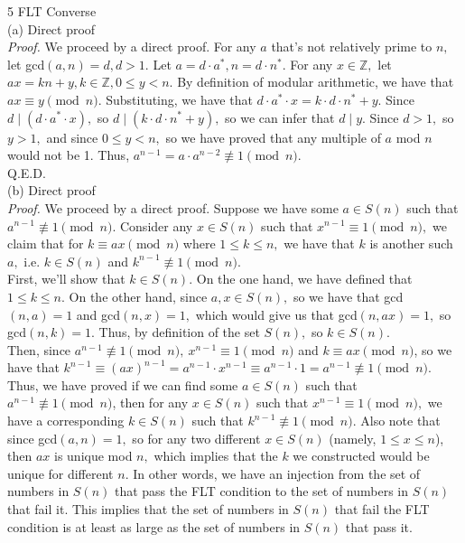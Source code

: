 \documentclass{article}
\begin{document}
{\Large 5 FLT Converse} \\[.5cm]
(a) Direct proof \\[.3cm]
\textit{Proof.} We proceed by a direct proof. For any $a$ that's not relatively prime to $n,$ let gcd$(a, n) = d, d > 1.$ Let $a = d\cdot a^*, n = d\cdot n^*.$ For any $x\in\mathbb{Z},$ let $ax = kn + y, k\in\mathbb{Z}, 0\leq y<n.$ By definition of modular arithmetic, we have that $ax\equiv y\pmod{n}.$ Substituting, we have that $d\cdot a^*\cdot x = k\cdot d\cdot n^* + y.$ Since $d\mid (d\cdot a^*\cdot x),$ so $d\mid (k\cdot d\cdot n^* + y),$ so we can infer that $d\mid y.$ Since $d > 1,$ so $y > 1,$ and since $0\leq y<n,$ so we have proved that any multiple of $a$ mod $n$ would not be 1. Thus, $a^{n-1} = a\cdot a^{n-2}\not\equiv1\pmod{n}.$ \\[.1cm]
Q.E.D.\\[.5cm]
(b) Direct proof \\[.3cm]
\textit{Proof.} We proceed by a direct proof. Suppose we have some $a\in S(n)$ such that $a^{n-1}\not\equiv1\pmod{n}.$ Consider any $x\in S(n)$ such that $x^{n-1}\equiv1\pmod{n},$ we claim that for $k\equiv ax\pmod{n}$ where $1\leq k\leq n,$ we have that $k$ is another such $a,$ i.e. $k\in S(n)$ and $k^{n-1}\not\equiv1\pmod{n}.$ \\[.1cm]
\indent First, we'll show that $k\in S(n).$ On the one hand, we have defined that $1\leq k\leq n.$ On the other hand, since $a,x\in S(n),$ so we have that gcd$(n, a) = 1$ and gcd$(n, x) = 1,$ which would give us that gcd$(n, ax) = 1,$ so gcd$(n, k) = 1$. Thus, by definition of the set $S(n),$ so $k\in S(n).$ \\[.1cm]
\indent Then, since $a^{n-1}\not\equiv1\pmod{n},\ x^{n-1}\equiv1\pmod{n}$ and $k\equiv ax\pmod{n}$, so we have that  $k^{n-1}\equiv(ax)^{n-1} = a^{n-1}\cdot x^{n-1}\equiv a^{n-1}\cdot1 = a^{n-1}\not\equiv1\pmod{n}.$ \\[.1cm]
Thus, we have proved if we can find some $a\in S(n)$ such that $a^{n-1}\not\equiv1\pmod{n}$, then for any $x\in S(n)$ such that $x^{n-1}\equiv1\pmod{n},$ we have a corresponding $k\in S(n)$ such that $k^{n-1}\not\equiv1\pmod{n}.$ Also note that since gcd$(a, n) = 1,$ so for any two different $x\in S(n)$ (namely, $1\leq x\leq n$), then $ax$ is unique mod $n,$ which implies that the $k$ we constructed would be unique for different $n$. In other words, we have an injection from the set of numbers in $S(n)$ that pass the FLT condition to the set of numbers in $S(n)$ that fail it. This implies that the set of numbers in $S(n)$ that fail the FLT condition is at least as large as the set of numbers in $S(n)$ that pass it. \\[.1cm]
\end{document}
